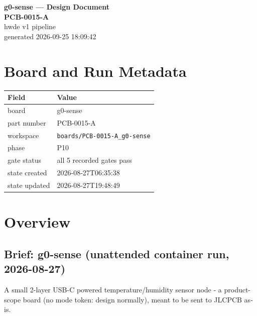 \documentclass[11pt,a4paper]{article}
\begin{document}
\sloppy
\begin{center}
{\LARGE\bfseries g0-sense --- Design Document}\\[6pt]
{\Large\bfseries PCB-0015-A}\\[6pt]
{\large hwde v1 pipeline}\\[2pt]
generated 2026-09-25 18:09:42
\end{center}
\tableofcontents

\section{Board and Run Metadata}
{\small
\begin{longtable}{lp{11cm}}
\toprule
\textbf{Field} & \textbf{Value} \\
\midrule
\endhead
board & g0-sense \\
part number & PCB-0015-A \\
workspace & \texttt{boards/PCB-0015-A\_g0-sense} \\
phase & P10 \\
gate status & all 5 recorded gates pass \\
state created & 2026-08-27T06:35:38 \\
state updated & 2026-08-27T19:48:49 \\
\bottomrule
\end{longtable}
}
\section{Overview}
\subsection*{Brief: g0-sense (unattended container run, 2026-08-27)}
A small 2-layer USB-C powered temperature/humidity sensor node - a product-scope board (no mode token: design normally), meant to be sent to JLCPCB as-is.
\end{document}
